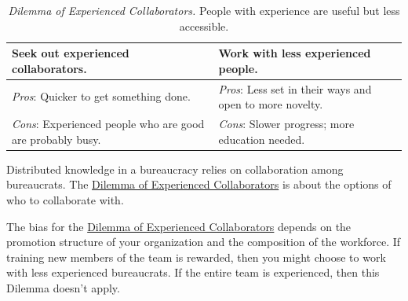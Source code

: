 \begin{center}
\begin{table}[H] %
\begin{tabular}{ | m{\dilemmatablewidth}| m{\dilemmatablewidth} | } 
  \hline
  \textbf{Seek out experienced collaborators.} & 
  \textbf{Work with less experienced people.} \\ 
  \hline
  \textit{Pros}: Quicker to get something done. &
  \textit{Pros}: Less set in their ways and open to more novelty. \\  
  \hline
  \textit{Cons}: Experienced people who are good are probably busy. &
  \textit{Cons}: Slower progress; more education needed. \\  
  \hline
\end{tabular}
\caption{
\textit{Dilemma of Experienced Collaborators.}
People with experience are useful but less accessible.
}
\label{table:dilemma-personal-experienced-collaborators}
\end{table}
\end{center}


Distributed knowledge in a bureaucracy relies on collaboration among bureaucrats. 
The \hyperref[table:dilemma-personal-experienced-collaborators]{Dilemma of Experienced Collaborators} is about the options of who to collaborate with. 


The bias for the \hyperref[table:dilemma-personal-experienced-collaborators]{Dilemma of Experienced Collaborators} depends on the promotion structure of your organization and the composition of the workforce. If training new members of the team is rewarded, then you might choose to work with less experienced bureaucrats. If the entire team is experienced, then this Dilemma doesn't apply.

